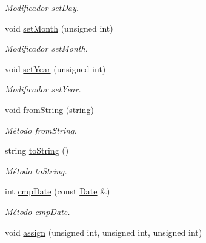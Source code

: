 \begin{DoxyCompactItemize}
\begin{DoxyCompactList}\small\item\em Modificador set\+Day. \end{DoxyCompactList}\item 
void \hyperlink{class_date_aae2c1d1158d2760ba4d5a23c528fd24d}{set\+Month} (unsigned int)\hypertarget{class_date_aae2c1d1158d2760ba4d5a23c528fd24d}{}\label{class_date_aae2c1d1158d2760ba4d5a23c528fd24d}

\begin{DoxyCompactList}\small\item\em Modificador set\+Month. \end{DoxyCompactList}\item 
void \hyperlink{class_date_abf7cafce8365f4ad601c270bb3f0f02d}{set\+Year} (unsigned int)\hypertarget{class_date_abf7cafce8365f4ad601c270bb3f0f02d}{}\label{class_date_abf7cafce8365f4ad601c270bb3f0f02d}

\begin{DoxyCompactList}\small\item\em Modificador set\+Year. \end{DoxyCompactList}\item 
void \hyperlink{class_date_a4ca1e1caba11928c842f6c62a2c851ab}{from\+String} (string)\hypertarget{class_date_a4ca1e1caba11928c842f6c62a2c851ab}{}\label{class_date_a4ca1e1caba11928c842f6c62a2c851ab}

\begin{DoxyCompactList}\small\item\em Método from\+String. \end{DoxyCompactList}\item 
string \hyperlink{class_date_adebdb45904dc2fbfacc66aa7528e0c04}{to\+String} ()
\begin{DoxyCompactList}\small\item\em Método to\+String. \end{DoxyCompactList}\item 
int \hyperlink{class_date_a8520d5d452c314684493a28c0a97e195}{cmp\+Date} (const \hyperlink{class_date}{Date} \&)
\begin{DoxyCompactList}\small\item\em Método cmp\+Date. \end{DoxyCompactList}\item 
void \hyperlink{class_date_a2ad9e0b62b3abea9c9d471373ce5fdef}{assign} (unsigned int, unsigned int, unsigned int)\hypertarget{class_date_a2ad9e0b62b3abea9c9d471373ce5fdef}{}\label{class_date_a2ad9e0b62b3abea9c9d471373ce5fdef}


\end{DoxyCompactItemize}
